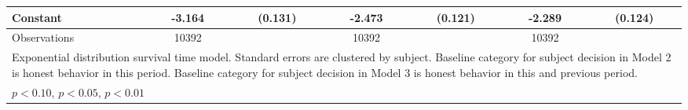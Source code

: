 {\begin{tabular}{l*{3}{cc}}
Constant        &   -3.164\sym{***}&  (0.131)&   -2.473\sym{***}&  (0.121)&   -2.289\sym{***}&  (0.124)\\
\hline
Observations    &    10392         &         &    10392         &         &    10392         &         \\
\hline\hline
\multicolumn{7}{l}{\footnotesize Exponential distribution survival time model. Standard errors are clustered by subject. Baseline category for subject decision in Model 2 is honest behavior in this period. Baseline category for subject decision in Model 3 is honest behavior in this and previous period.}\\
\multicolumn{7}{l}{\footnotesize \sym{*} \(p<0.10\), \sym{**} \(p<0.05\), \sym{***} \(p<0.01\)}\\
\end{tabular}
}
